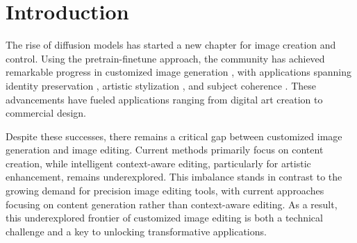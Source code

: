 
\section{Introduction}

The rise of diffusion models has started a new chapter for image creation and control. Using the pretrain-finetune approach, the community has achieved remarkable progress in customized image generation \cite{ruiz2023dreambooth, TI, lora}, with applications spanning identity preservation \cite{facechain}, artistic stylization \cite{song2024processpainter, zhang2023inversion,sohn2023styledrop,ahn2024dreamstyler}, and subject coherence \cite{customdiff,ruiz2023dreambooth, TI,lora,ruiz2024hyperdreambooth,jiang2024videobooth,zhu2024multibooth}. These advancements have fueled applications ranging from digital art creation to commercial design.

Despite these successes, there remains a critical gap between customized image generation and image editing. Current methods primarily focus on content creation, while intelligent context-aware editing, particularly for artistic enhancement, remains underexplored. This imbalance stands in contrast to the growing demand for precision image editing tools, with current approaches focusing on content generation rather than context-aware editing. As a result, this underexplored frontier of customized image editing is both a technical challenge and a key to unlocking transformative applications.



